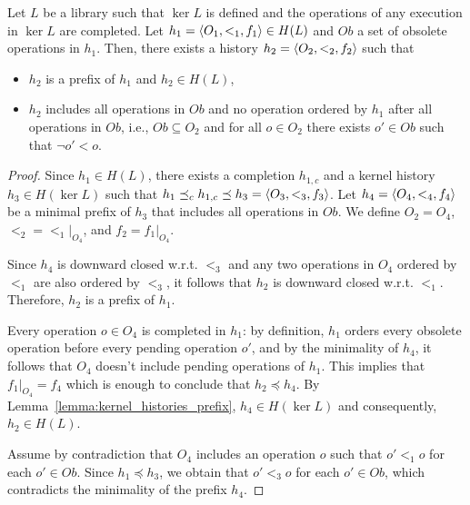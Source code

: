 \begin{lemma}\label{lemma:pref_obsolete}

Let $L$ be a library such that $\ker L$ is defined and the operations of any execution in $\ker L$ are completed.
Let $h_1=\left\langle {O_1,<_1,f_1} \right\rangle\in H(L)$ and $Ob$ a set of obsolete operations in $h_1$. Then, there exists a 
history $h_2=\left\langle {O_2,<_2,f_2} \right\rangle$ such that 

\begin{itemize}

	\item $h_2$ is a prefix of $h_1$ and $h_2\in H(L)$, 

	\item $h_2$ includes all operations in $Ob$ and no operation ordered by $h_1$ after all operations in $Ob$, i.e.,
	$Ob\subseteq O_2$ and for all $o\in O_2$ there exists $o'\in Ob$ such that $\neg o'<o$.
	
\end{itemize}

\end{lemma}

\begin{proof}

Since $h_1\in H(L)$, there exists a completion $h_{1,c}$ and a kernel history $h_3\in H(\ker L)$ such that
$h_1\preceq_c h_{1,c} \preceq h_3=\left\langle {O_3,<_3,f_3} \right\rangle$. Let $h_4=\left\langle {O_4,<_4,f_4} \right\rangle$ be a minimal prefix of $h_3$ that
includes all operations in $Ob$. We define $O_2=O_4$, $<_2=<_1 |_{O_4}$, and $f_2=f_1 |_{O_4}$.

Since $h_4$ is downward closed w.r.t. $<_3$ and any two operations in $O_4$ ordered by $<_1$ are 
also ordered by $<_3$, it follows that $h_2$ is downward closed w.r.t. $<_1$. 
Therefore, $h_2$ is a prefix of $h_1$.

Every operation $o\in O_4$ is completed in $h_1$: by definition, 
$h_1$ orders every obsolete operation before every pending operation $o'$,
and by the minimality of $h_4$, it follows that $O_4$ doesn't include pending operations
of $h_1$. This implies that $f_1 |_{O_4}=f_4$ which is enough to conclude that 
$h_2\preceq h_4$. By Lemma~\ref{lemma:kernel_histories_prefix}, $h_4\in H(\ker L)$ and consequently, 
$h_2\in H(L)$.

Assume by contradiction that $O_4$ includes an operation $o$ such that $o' <_1 o$ for each $o'\in Ob$.
Since $h_1\preceq h_3$, we obtain that $o' <_3 o$ for each $o'\in Ob$, which contradicts the minimality of
the prefix $h_4$.
\end{proof}


